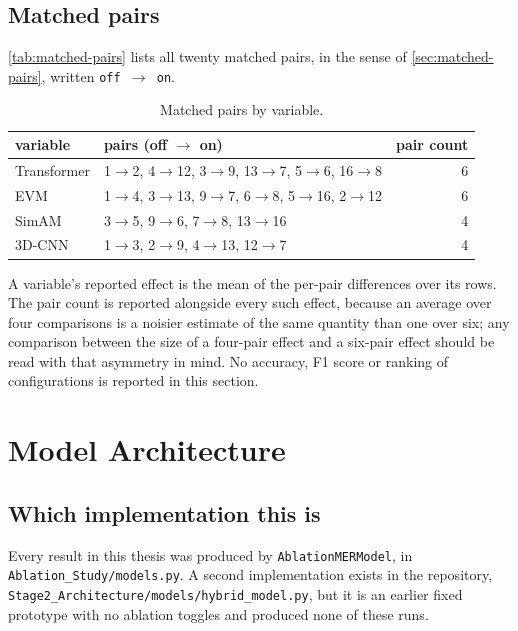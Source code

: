 \subsection{Matched pairs}
\label{sec:matched-pairs-table}

\autoref{tab:matched-pairs} lists all twenty matched pairs, in the sense of \autoref{sec:matched-pairs}, written \texttt{off $\rightarrow$ on}.

\begin{table}[htbp]
	\centering
	\begin{tabular}{l l r}
		\hline
		\textbf{variable} & \textbf{pairs (off $\rightarrow$ on)} & \textbf{pair count} \\
		\hline
		Transformer & 1$\rightarrow$2, 4$\rightarrow$12, 3$\rightarrow$9, 13$\rightarrow$7, 5$\rightarrow$6, 16$\rightarrow$8 & 6 \\
		EVM         & 1$\rightarrow$4, 3$\rightarrow$13, 9$\rightarrow$7, 6$\rightarrow$8, 5$\rightarrow$16, 2$\rightarrow$12 & 6 \\
		SimAM       & 3$\rightarrow$5, 9$\rightarrow$6, 7$\rightarrow$8, 13$\rightarrow$16 & 4 \\
		3D-CNN      & 1$\rightarrow$3, 2$\rightarrow$9, 4$\rightarrow$13, 12$\rightarrow$7 & 4 \\
		\hline
	\end{tabular}
	\caption[Matched pairs by variable]{Matched pairs by variable.}
	\label{tab:matched-pairs}
\end{table}

A variable's reported effect is the mean of the per-pair differences over its rows. The pair count is reported alongside every such effect, because an average over four comparisons is a noisier estimate of the same quantity than one over six; any comparison between the size of a four-pair effect and a six-pair effect should be read with that asymmetry in mind. No accuracy, F1 score or ranking of configurations is reported in this section.


\section{Model Architecture}
\label{sec:architecture}

\subsection{Which implementation this is}
\label{sec:which-implementation}

Every result in this thesis was produced by \texttt{AblationMERModel}, in \texttt{Ablation\_Study/models.py}. A second implementation exists in the repository, \texttt{Stage2\_Architecture/models/hybrid\_model.py}, but it is an earlier fixed prototype with no ablation toggles and produced none of these runs.

